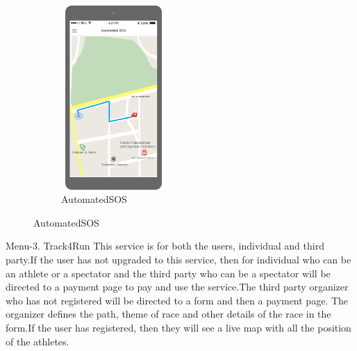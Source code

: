 \begin{figure}[H]
	\centering
	\begin{subfigure}[b]{0.4\textwidth}	
		\includegraphics[width=4cm,height=7cm]		{./Mockups/8_I-AutomatedSOS.png}
      	\caption{AutomatedSOS}
        \label{TrackMe_AutomatedSOS}
	 \end{subfigure}
\end{figure}

Menu-3. Track4Run\newline
This service is for both the users, individual and third party.\newline If the user has not upgraded to this service, then for individual who can be an athlete or a spectator and the third party who can be a spectator will be directed to a payment page to pay and use the service.\newline The third party organizer who has not registered will be directed to a form and then a payment page. The organizer defines the path, theme of race and other details of the race in the form.\newline If the user has registered, then they will see a live map with all the position of the athletes.

